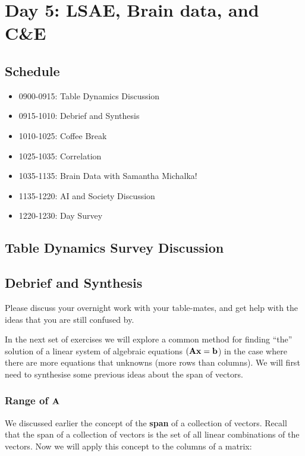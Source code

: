 \chapter{Day 5: LSAE, Brain data, and C\&E}

\section{Schedule}
\begin{itemize}
    \item 0900-0915: Table Dynamics Discussion
    \item 0915-1010: Debrief and Synthesis
    \item 1010-1025: Coffee Break
    \item 1025-1035: Correlation
    \item 1035-1135: Brain Data with Samantha Michalka!
    \item 1135-1220: AI and Society Discussion
    \item 1220-1230: Day Survey
\end{itemize}

\section{Table Dynamics Survey Discussion}

\section{Debrief and Synthesis}

\bi
\item Please discuss your overnight work with your table-mates, and get help with the ideas that you are still confused by.
\ei

In the next set of exercises we will explore a common method for finding ``the'' solution of a linear system of algebraic equations $(\mathbf{A} \mathbf{x} = \mathbf{b}$) in the case where there are more equations that unknowns (more rows than columns). We will first need to synthesise some previous ideas about the span of vectors.

\subsection{Range of $\mathbf{A}$}

We discussed earlier the concept of the \textbf{span} of a collection of vectors. Recall that the span of a collection of vectors is the set of all linear combinations of the vectors. Now we will apply this concept to the columns of a matrix:

